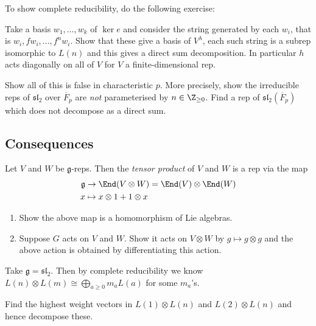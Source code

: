\documentclass[a4paper]{article}
\newcommand*{\Lie}[1]{\mathfrak{#1}} %
\begin{document}
To show complete reducibility, do the following exercise:

\begin{ex}
  Take a basis \(w_1, \dots, w_k\) of \(\ker e\) and consider the string generated by each \(w_i\), that is \(w_i, fw_i, \dots, f^n w_i\). Show that these give a basis of \(V^\lambda\), each such string is a subrep isomorphic to \(L(n)\) and this gives a direct sum decomposition. In particular \(h\) acts diagonally on all of \(V\) for \(V\) a finite-dimensional rep.
\end{ex}

\begin{ex}
  Show all of this is false in characteristic \(p\). More precisely, show the irreducible reps of \(\Lie{sl}_2\) over \(\overline F_p\) are \emph{not} parameterised by \(n \in \Z_{\geq 0}\). Find a rep of \(\Lie{sl}_2(\overline F_p)\) which does not decompose as a direct sum.
\end{ex}

\subsection{Consequences}

\begin{definition}
  Let \(V\) and \(W\) be \(\Lie g\)-reps. Then the \emph{tensor product} of \(V\) and \(W\) is a rep via the map
  \begin{align*}
    \Lie g &\to \End(V \otimes W) = \End(V) \otimes \End(W) \\
    x &\mapsto x \otimes 1 + 1 \otimes x
  \end{align*}
\end{definition}

\begin{ex}\leavevmode
  \begin{enumerate}
  \item Show the above map is a homomorphism of Lie algebras.
  \item Suppose \(G\) acts on \(V\) and \(W\). Show it acts on \(V \otimes W\) by \(g \mapsto g \otimes g\) and the above action is obtained by differentiating this action.
  \end{enumerate}
\end{ex}

Take \(\Lie g = \Lie{sl}_2\). Then by complete reducibility we know \(L(n) \otimes L(m) \cong \bigoplus_{a \geq 0} m_a L(a)\) for some \(m_a\)'s.

\begin{ex}
  Find the highest weight vectors in \(L(1) \otimes L(n)\) and \(L(2) \otimes L(n)\) and hence decompose these.
\end{ex}
\end{document}
